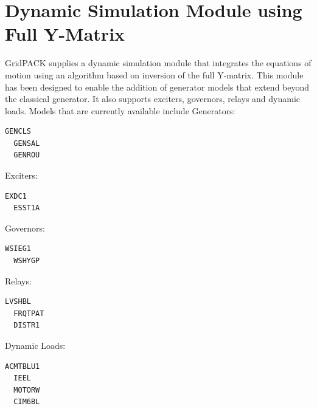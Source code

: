 \documentclass[12pt]{report} %
\begin{document}
\section{Dynamic Simulation Module using Full Y-Matrix}

GridPACK supplies a dynamic simulation module that integrates the equations of motion using an algorithm based on inversion of the full Y-matrix. This module has been designed to enable the addition of generator models that extend beyond the classical generator. It also supports exciters, governors, relays and dynamic loads. Models that are currently available include
Generators:

{
\color{red}
\begin{Verbatim}[fontseries=b]
  GENCLS
  GENSAL
  GENROU
\end{Verbatim}
}

Exciters:

{
\color{red}
\begin{Verbatim}[fontseries=b]
  EXDC1
  ESST1A
\end{Verbatim}
}

Governors:

{
\color{red}
\begin{Verbatim}[fontseries=b]
  WSIEG1
  WSHYGP
\end{Verbatim}
}

Relays:

{
\color{red}
\begin{Verbatim}[fontseries=b]
  LVSHBL
  FRQTPAT
  DISTR1
\end{Verbatim}
}

Dynamic Loads:

{
\color{red}
\begin{Verbatim}[fontseries=b]
  ACMTBLU1
  IEEL
  MOTORW
  CIM6BL
\end{Verbatim}
}
\end{document}
